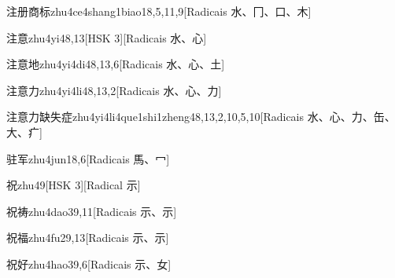 \begin{entry}{注册商标}{zhu4ce4shang1biao1}{8,5,11,9}[Radicais ⽔、⼌、⼝、⽊]
\end{entry}

\begin{entry}{注意}{zhu4yi4}{8,13}[HSK 3][Radicais ⽔、⼼]
\end{entry}

\begin{entry}{注意地}{zhu4yi4di4}{8,13,6}[Radicais ⽔、⼼、⼟]
\end{entry}

\begin{entry}{注意力}{zhu4yi4li4}{8,13,2}[Radicais ⽔、⼼、⼒]
\end{entry}

\begin{entry}{注意力缺失症}{zhu4yi4li4que1shi1zheng4}{8,13,2,10,5,10}[Radicais ⽔、⼼、⼒、⽸、⼤、⽧]
\end{entry}

\begin{entry}{驻军}{zhu4jun1}{8,6}[Radicais ⾺、⼍]
\end{entry}

\begin{entry}{祝}{zhu4}{9}[HSK 3][Radical ⽰]
\end{entry}

\begin{entry}{祝祷}{zhu4dao3}{9,11}[Radicais ⽰、⽰]
\end{entry}

\begin{entry}{祝福}{zhu4fu2}{9,13}[Radicais ⽰、⽰]
\end{entry}

\begin{entry}{祝好}{zhu4hao3}{9,6}[Radicais ⽰、⼥]
\end{entry}


